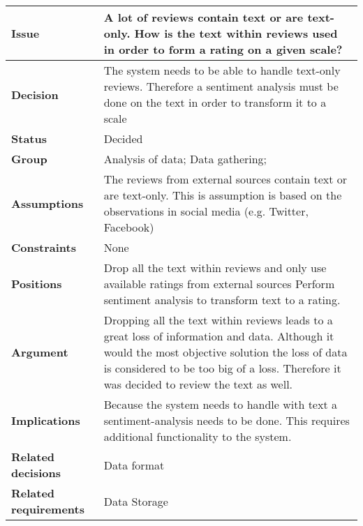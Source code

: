 
\label{dd:t-to-r}
\begin{tabular}{ l  p{10cm}}
\hline
\bf Issue & A lot of reviews contain text or are text-only. How is the text within reviews used in order to form a rating on a given scale?\\
\hline
\bf Decision & The system needs to be able to handle text-only reviews. Therefore a sentiment analysis must be done on the text in order to transform it to a scale\\
\hline
\bf Status & Decided\\
\hline
\bf Group & Analysis of data; Data gathering; \\
\hline
\bf Assumptions & The reviews from external sources contain text or are text-only. This is assumption is based on the observations in social media (e.g. Twitter, Facebook) \\
\hline
\bf Constraints & None \\
\hline
\bf Positions & Drop all the text within reviews and only use available ratings from external sources \newline\newline
Perform sentiment analysis to transform text to a rating. \\
\hline
\bf Argument & Dropping all the text within reviews leads to a great loss of information and data. Although it would the most objective solution the loss of data is considered to be too big of a loss. Therefore it was decided to review the text as well. \\
\hline
\bf Implications & Because the system needs to handle with text a sentiment-analysis needs to be done. This requires additional functionality to the system.\\
\hline
\bf Related decisions & Data format \\
\hline
\bf Related requirements  & Data Storage \\
\hline
\end{tabular}
